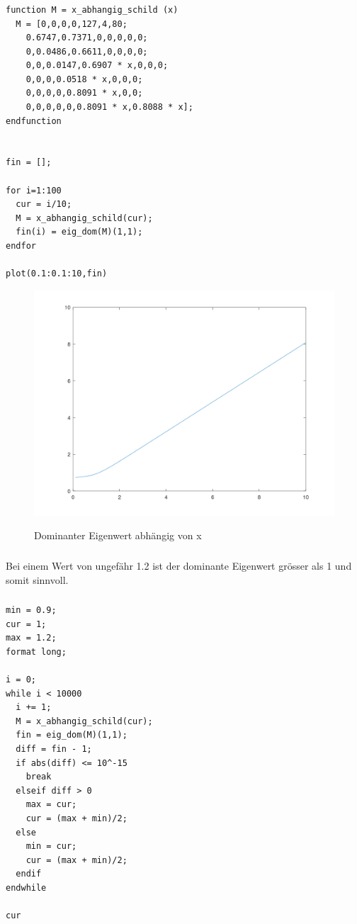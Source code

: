 \documentclass{article}
\begin{document}
\subsubsection{}
\begin{lstlisting}
function M = x_abhangig_schild (x)
  M = [0,0,0,0,127,4,80;
    0.6747,0.7371,0,0,0,0,0;
    0,0.0486,0.6611,0,0,0,0;
    0,0,0.0147,0.6907 * x,0,0,0;
    0,0,0,0.0518 * x,0,0,0;
    0,0,0,0,0.8091 * x,0,0;
    0,0,0,0,0,0.8091 * x,0.8088 * x];
endfunction


fin = [];

for i=1:100
  cur = i/10;
  M = x_abhangig_schild(cur);
  fin(i) = eig_dom(M)(1,1);
endfor

plot(0.1:0.1:10,fin)
\end{lstlisting}

\begin{figure}[H]
\centering
\includegraphics[scale=0.3]{plot_abh_x.png}
\label{fig:universe}
\caption{Dominanter Eigenwert abhängig von x}
\end{figure}

\subsubsection{}
Bei einem Wert von ungefähr 1.2 ist der dominante Eigenwert grösser als 1 und somit sinnvoll.

\subsubsection{}
\begin{lstlisting}
min = 0.9;
cur = 1;
max = 1.2;
format long;

i = 0;
while i < 10000
  i += 1;
  M = x_abhangig_schild(cur);
  fin = eig_dom(M)(1,1);
  diff = fin - 1;
  if abs(diff) <= 10^-15
    break
  elseif diff > 0
    max = cur;
    cur = (max + min)/2;
  else
    min = cur;
    cur = (max + min)/2;
  endif
endwhile

cur
\end{lstlisting}
\end{document}

